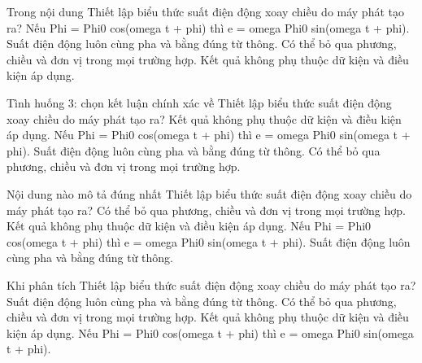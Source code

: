 \begin{ex}
Trong nội dung Thiết lập biểu thức suất điện động xoay chiều do máy phát tạo ra?
\choice
{\True Nếu Phi = Phi0 cos(omega t + phi) thì e = omega Phi0 sin(omega t + phi).}
{Suất điện động luôn cùng pha và bằng đúng từ thông.}
{Có thể bỏ qua phương, chiều và đơn vị trong mọi trường hợp.}
{Kết quả không phụ thuộc dữ kiện và điều kiện áp dụng.}
\end{ex}

\begin{ex}
Tình huống 3: chọn kết luận chính xác về Thiết lập biểu thức suất điện động xoay chiều do máy phát tạo ra?
\choice
{Kết quả không phụ thuộc dữ kiện và điều kiện áp dụng.}
{\True Nếu Phi = Phi0 cos(omega t + phi) thì e = omega Phi0 sin(omega t + phi).}
{Suất điện động luôn cùng pha và bằng đúng từ thông.}
{Có thể bỏ qua phương, chiều và đơn vị trong mọi trường hợp.}
\end{ex}

\begin{ex}
Nội dung nào mô tả đúng nhất Thiết lập biểu thức suất điện động xoay chiều do máy phát tạo ra?
\choice
{Có thể bỏ qua phương, chiều và đơn vị trong mọi trường hợp.}
{Kết quả không phụ thuộc dữ kiện và điều kiện áp dụng.}
{\True Nếu Phi = Phi0 cos(omega t + phi) thì e = omega Phi0 sin(omega t + phi).}
{Suất điện động luôn cùng pha và bằng đúng từ thông.}
\end{ex}

\begin{ex}
Khi phân tích Thiết lập biểu thức suất điện động xoay chiều do máy phát tạo ra?
\choice
{Suất điện động luôn cùng pha và bằng đúng từ thông.}
{Có thể bỏ qua phương, chiều và đơn vị trong mọi trường hợp.}
{Kết quả không phụ thuộc dữ kiện và điều kiện áp dụng.}
{\True Nếu Phi = Phi0 cos(omega t + phi) thì e = omega Phi0 sin(omega t + phi).}
\end{ex}

